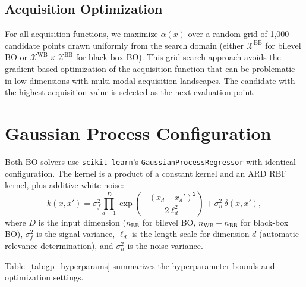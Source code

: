 \documentclass[12pt,a4paper]{article}%
\theoremstyle{plain}%
\theoremstyle{remark}%
\theoremstyle{definition}%
\def\WB{\mathrm{WB}}
\def\BB{\mathrm{BB}}
\begin{document}
\begin{appendices}
\subsection{Acquisition Optimization}\label{subsec:app_acq_opt}

For all acquisition functions, we maximize $\alpha(x)$ over a random grid of 1{,}000 candidate points drawn uniformly from the search domain (either $\mathcal{X}^{\BB}$ for bilevel BO or $\mathcal{X}^{\WB} \times \mathcal{X}^{\BB}$ for black-box BO). This grid search approach avoids the gradient-based optimization of the acquisition function that can be problematic in low dimensions with multi-modal acquisition landscapes. The candidate with the highest acquisition value is selected as the next evaluation point.

\section{Gaussian Process Configuration}\label{sec:gp_details}

Both BO solvers use \texttt{scikit-learn}'s \texttt{GaussianProcessRegressor} with identical configuration. The kernel is a product of a constant kernel and an ARD RBF kernel, plus additive white noise:
\begin{equation}\label{eq:gp_kernel_full}
    k(x, x') = \sigma_f^2 \prod_{d=1}^{D} \exp\!\left(-\frac{(x_d - x_d')^2}{2\ell_d^2}\right) + \sigma_n^2\,\delta(x, x'),
\end{equation}
where $D$ is the input dimension ($n_{\BB}$ for bilevel BO, $n_{\WB}+n_{\BB}$ for black-box BO), $\sigma_f^2$ is the signal variance, $\ell_d$ is the length scale for dimension $d$ (automatic relevance determination), and $\sigma_n^2$ is the noise variance.

Table~\ref{tab:gp_hyperparams} summarizes the hyperparameter bounds and optimization settings.


\end{appendices}
\end{document}
